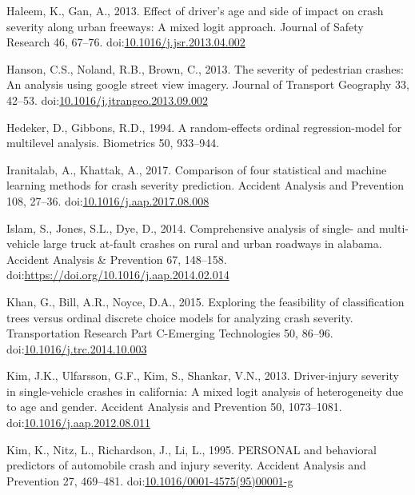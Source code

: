 \documentclass[]{elsarticle} %
\begin{document}
\leavevmode\hypertarget{ref-Haleem2013effect}{}%
Haleem, K., Gan, A., 2013. Effect of driver's age and side of impact on
crash severity along urban freeways: A mixed logit approach. Journal of
Safety Research 46, 67--76.
doi:\href{https://doi.org/10.1016/j.jsr.2013.04.002}{10.1016/j.jsr.2013.04.002}

\leavevmode\hypertarget{ref-Hanson2013severity}{}%
Hanson, C.S., Noland, R.B., Brown, C., 2013. The severity of pedestrian
crashes: An analysis using google street view imagery. Journal of
Transport Geography 33, 42--53.
doi:\href{https://doi.org/10.1016/j.jtrangeo.2013.09.002}{10.1016/j.jtrangeo.2013.09.002}

\leavevmode\hypertarget{ref-Hedeker1994random}{}%
Hedeker, D., Gibbons, R.D., 1994. A random-effects ordinal
regression-model for multilevel analysis. Biometrics 50, 933--944.

\leavevmode\hypertarget{ref-Iranitalab2017comparison}{}%
Iranitalab, A., Khattak, A., 2017. Comparison of four statistical and
machine learning methods for crash severity prediction. Accident
Analysis and Prevention 108, 27--36.
doi:\href{https://doi.org/10.1016/j.aap.2017.08.008}{10.1016/j.aap.2017.08.008}

\leavevmode\hypertarget{ref-Islam2014comprehensive}{}%
Islam, S., Jones, S.L., Dye, D., 2014. Comprehensive analysis of single-
and multi-vehicle large truck at-fault crashes on rural and urban
roadways in alabama. Accident Analysis \& Prevention 67, 148--158.
doi:\href{https://doi.org/https://doi.org/10.1016/j.aap.2014.02.014}{https://doi.org/10.1016/j.aap.2014.02.014}

\leavevmode\hypertarget{ref-Khan2015exploring}{}%
Khan, G., Bill, A.R., Noyce, D.A., 2015. Exploring the feasibility of
classification trees versus ordinal discrete choice models for analyzing
crash severity. Transportation Research Part C-Emerging Technologies 50,
86--96.
doi:\href{https://doi.org/10.1016/j.trc.2014.10.003}{10.1016/j.trc.2014.10.003}

\leavevmode\hypertarget{ref-Kim2013driver}{}%
Kim, J.K., Ulfarsson, G.F., Kim, S., Shankar, V.N., 2013. Driver-injury
severity in single-vehicle crashes in california: A mixed logit analysis
of heterogeneity due to age and gender. Accident Analysis and Prevention
50, 1073--1081.
doi:\href{https://doi.org/10.1016/j.aap.2012.08.011}{10.1016/j.aap.2012.08.011}

\leavevmode\hypertarget{ref-Kim1995personal}{}%
Kim, K., Nitz, L., Richardson, J., Li, L., 1995. PERSONAL and behavioral
predictors of automobile crash and injury severity. Accident Analysis
and Prevention 27, 469--481.
doi:\href{https://doi.org/10.1016/0001-4575(95)00001-g}{10.1016/0001-4575(95)00001-g}
\end{document}
